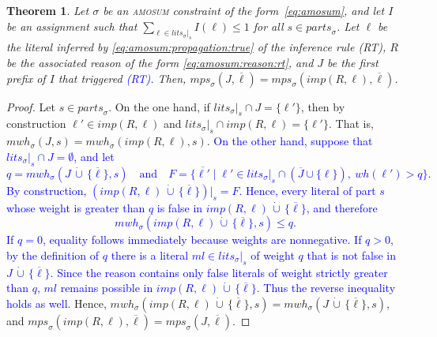 \documentclass[preprint,authoryear]{elsarticle}
\newcommand{\lits}{\mathit{lits}}
\newcommand{\mwh}{\mathit{mwh}}
\newcommand{\wh}{\mathit{wh}}
\newcommand{\ml}{\mathit{ml}}
\newcommand{\mps}{\mathit{mps}}
\newcommand{\parts}{\mathit{parts}}
\newcommand{\cupdot}{\,\dot{\cup}\,}
\newtheorem{theorem}{Theorem}[section]
\theoremstyle{definition}
\begin{document}
\begin{theorem}
    \label{thm:mps:reason:eq:rt}
    Let $\sigma$ be an \textsc{amosum} constraint of the form~\eqref{eq:amosum}, and let $I$ be an assignment such that $\sum_{\ell \in \mathit{lits}_\sigma|_s}{I(\ell)} \leq 1$ for all $s \in \mathit{parts}_{\sigma}$. Let $\ell$ be the literal inferred by  \textcolor{blue}{\eqref{eq:amosum:propagation:true}} of the inference rule (RT), $R$ be the associated reason of the form \eqref{eq:amosum:reason:rt},  and $J$ be the first prefix of $I$ that triggered \textcolor{blue}{(RT).} 
    Then, $\mps_\sigma(J,\overline{\ell})=\mps_\sigma(\mathit{imp}(R,\ell),\overline{\ell})$. 
\end{theorem}
\begin{proof}
    Let $s \in \parts_\sigma$.
    On the one hand, if $\lits_\sigma|_s \cap J = \{\ell'\}$, then by construction $\ell' \in \mathit{imp}(R,\ell)$ and $\lits_\sigma|_s \cap \mathit{imp}(R,\ell) = \{\ell'\}$.
    That is, $\mwh_\sigma(J,s)=\mwh_\sigma(\mathit{imp}(R,\ell),s)$.
    \textcolor{blue}{On the other hand, suppose that $\lits_\sigma|_s \cap J = \emptyset$, and let 
    $$
     q=\mwh_\sigma(J\cupdot\{\overline{\ell}\},s)
     \quad\text{and}\quad
     F=\{\overline{\ell'}\mid \ell'\in\lits_\sigma|_s\cap(\overline{J} \cup \{\ell\}),\ \wh(\ell')>q\}.
    $$
    By construction, $(\mathit{imp}(R,\ell)\cupdot \{\overline{\ell}\})|_s=F$. Hence, every literal of part $s$ whose weight is greater than $q$ is false in $\mathit{imp}(R,\ell)\cupdot\{\overline{\ell}\}$, and therefore
    $$
    \mwh_\sigma(\mathit{imp}(R,\ell)\cupdot\{\overline{\ell}\},s)\le q.
    $$
    If $q=0$, equality follows immediately because weights are nonnegative. 
    If $q>0$, by the definition of $q$ there is a literal $\ml\in\lits_\sigma|_s$ of weight $q$ that is not false in $J\cupdot\{\overline{\ell}\}$. Since the reason contains only false literals of weight strictly greater than $q$, $\ml$ remains possible in $\mathit{imp}(R,\ell)\cupdot\{\overline{\ell}\}$. 
    Thus the reverse inequality holds as well.}
    Hence, $\mwh_\sigma(\mathit{imp}(R,\ell) \cupdot \{\overline{\ell}\},s) = \mwh_\sigma(J \cupdot \{ {\overline{\ell}} \},s)$, and $\mps_\sigma(\mathit{imp}(R,\ell),\overline{\ell}) = \mps_\sigma(J, \overline{\ell})$.
\end{proof}
\end{document}
